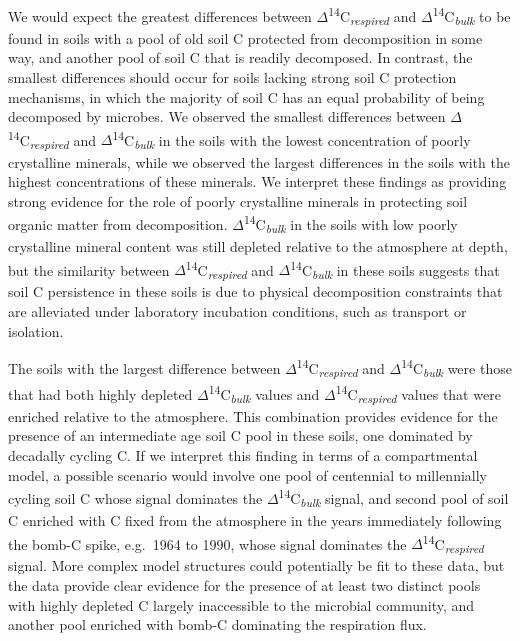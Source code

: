 \documentclass[english,man,floatsintext]{apa6}
\begin{document}
We would expect the greatest differences between \(\Delta\)\textsuperscript{14}C\textsubscript{\emph{respired}} and \(\Delta\)\textsuperscript{14}C\textsubscript{\emph{bulk}} to be found in soils with a pool of old soil C protected from decomposition in some way, and another pool of soil C that is readily decomposed. In contrast, the smallest differences should occur for soils lacking strong soil C protection mechanisms, in which the majority of soil C has an equal probability of being decomposed by microbes. We observed the smallest differences between \(\Delta\)\textsuperscript{14}C\textsubscript{\emph{respired}} and \(\Delta\)\textsuperscript{14}C\textsubscript{\emph{bulk}} in the soils with the lowest concentration of poorly crystalline minerals, while we observed the largest differences in the soils with the highest concentrations of these minerals. We interpret these findings as providing strong evidence for the role of poorly crystalline minerals in protecting soil organic matter from decomposition. \(\Delta\)\textsuperscript{14}C\textsubscript{\emph{bulk}} in the soils with low poorly crystalline mineral content was still depleted relative to the atmosphere at depth, but the similarity between \(\Delta\)\textsuperscript{14}C\textsubscript{\emph{respired}} and \(\Delta\)\textsuperscript{14}C\textsubscript{\emph{bulk}} in these soils suggests that soil C persistence in these soils is due to physical decomposition constraints that are alleviated under laboratory incubation conditions, such as transport or isolation.

The soils with the largest difference between \(\Delta\)\textsuperscript{14}C\textsubscript{\emph{respired}} and \(\Delta\)\textsuperscript{14}C\textsubscript{\emph{bulk}} were those that had both highly depleted \(\Delta\)\textsuperscript{14}C\textsubscript{\emph{bulk}} values and \(\Delta\)\textsuperscript{14}C\textsubscript{\emph{respired}} values that were enriched relative to the atmosphere. This combination provides evidence for the presence of an intermediate age soil C pool in these soils, one dominated by decadally cycling C. If we interpret this finding in terms of a compartmental model, a possible scenario would involve one pool of centennial to millennially cycling soil C whose signal dominates the \(\Delta\)\textsuperscript{14}C\textsubscript{\emph{bulk}} signal, and second pool of soil C enriched with C fixed from the atmosphere in the years immediately following the bomb-C spike, e.g.~1964 to 1990, whose signal dominates the \(\Delta\)\textsuperscript{14}C\textsubscript{\emph{respired}} signal. More complex model structures could potentially be fit to these data, but the data provide clear evidence for the presence of at least two distinct pools with highly depleted C largely inaccessible to the microbial community, and another pool enriched with bomb-C dominating the respiration flux.
\end{document}
